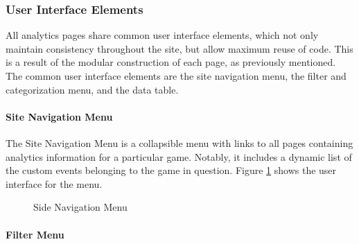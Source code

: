 \subsubsection{User Interface Elements}

All analytics pages share common user interface elements, which not only maintain consistency throughout the site, but allow maximum reuse of code. This is a result of the modular construction of each page, as previously mentioned. The common user interface elements are the site navigation menu, the filter and categorization menu, and the data table. 

\paragraph{Site Navigation Menu}

The Site Navigation Menu is a collapsible menu with links to all pages containing analytics information for a particular game. Notably, it includes a dynamic list of the custom events belonging to the game in question. Figure \ref{fig:nav_menu} shows the user interface for the menu.

\begin{figure}[htb]
	\caption[Analytics Site: Side Navigation Menu]{\label{fig:nav_menu} Side Navigation Menu}
\end{figure}

\paragraph{Filter Menu}

